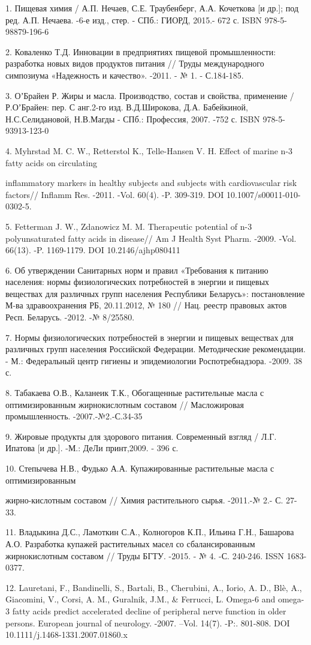 \begin{noparindent}
1. Пищевая химия / А.П. Нечаев, С.Е. Траубенберг, А.А. Кочеткова {[}и
др.{]}; под ред. А.П. Нечаева. -6-е изд., стер. - СПб.: ГИОРД, 2015.-
672 с. ISBN 978-5-98879-196-6

2. Коваленко Т.Д. Инновации в предприятиях пищевой промышленности:
разработка новых видов продуктов питания // Труды международного
симпозиума «Надежность и качество». -2011. - № 1. - С.184-185.

3. ОʼБрайен Р. Жиры и масла. Производство, состав и свойства, применение
/ Р.ОʼБрайен: пер. С анг.2-го изд. В.Д.Широкова, Д.А. Бабейкиной,
Н.С.Селидановой, Н.В.Магды - СПб.: Профессия, 2007. -752 с. ISBN
978-5-93913-123-0

4. Myhrstad M. C. W., Retterstol K., Telle-Hansen V. H. Effect of marine
n-3 fatty acids on circulating

inflammatory markers in healthy subjects
and subjects with cardiovascular risk factors// Inflamm Res. -2011.
-Vol. 60(4). -P. 309-319. DOI 10.1007/s00011-010-0302-5.

5. Fetterman J. W., Zdanowicz M. M. Therapeutic potential of n-3
polyunsaturated fatty acids in disease// Am J Health Syst Pharm. -2009.
-Vol. 66(13). -P. 1169-1179. DOI 10.2146/ajhp080411

6. Об утверждении Санитарных норм и правил «Требования к питанию
населения: нормы физиологических потребностей в энергии и пищевых
веществах для различных групп населения Республики Беларусь»:
постановление М-ва здравоохранения РБ, 20.11.2012, № 180 // Нац. реестр
правовых актов Респ. Беларусь. -2012. -№ 8/25580.

7. Нормы физиологических потребностей в энергии и пищевых веществах для
различных групп населения Российской Федерации. Методические
рекомендации. - М.: Федеральный центр гигиены и эпидемиологии
Роспотребнадзора. -2009. 38 с.

8. Табакаева О.В., Каланеик Т.К., Обогащенные растительные масла с
оптимизированным жирнокислотным составом // Масложировая промышленность.
-2007.-№2.-С.34-35

9. Жировые продукты для здорового питания. Современный взгляд / Л.Г.
Ипатова {[}и др.{]}. -М.: ДеЛи принт,2009. - 396 с.

10. Степычева Н.В., Фудько А.А. Купажированные растительные масла с
оптимизированным

жирно-кислотным составом // Химия растительного сырья.
-2011.-№ 2.- С. 27-33.

11. Владыкина Д.С., Ламоткин С.А., Колногоров К.П., Ильина Г.Н.,
Башарова А.О. Разработка купажей растительных масел со сбалансированным
жирнокислотным составом // Труды БГТУ. -2015. - № 4. -С. 240-246. ISSN
1683-0377.

12. Lauretani, F., Bandinelli, S., Bartali, B., Cherubini, A., Iorio, A.
D., Blè, A., Giacomini, V., Corsi, A. M., Guralnik, J.M., \& Ferrucci,
L. Omega-6 and omega-3 fatty acids predict accelerated decline of
peripheral nerve function in older persons. European journal of
neurology. -2007. --Vol. 14(7). -P:. 801-808. DOI
10.1111/j.1468-1331.2007.01860.x
\end{noparindent}

